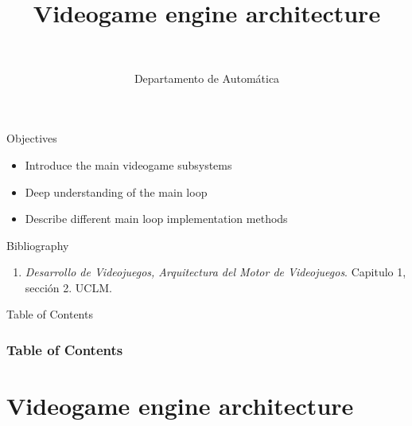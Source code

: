 \documentclass[10pt,compress]{beamer} %
\title[Videogame engine architecture]{Videogame engine architecture}
\author{\asignatura\\\carrera}
\institute{}
\date{Departamento de Automática}
\begin{document}
{\titlepageBlue
    \begin{frame}
        \titlepage
    \end{frame}
}

\begin{frame}[plain]{}
   \begin{block}{Objectives}
   \begin{itemize}
        \item Introduce the main videogame subsystems
        \item Deep understanding of the main loop
        \item Describe different main loop implementation methods
	\end{itemize}
	\end{block}

   \begin{block}{Bibliography}
      \begin{enumerate}
          \item  \textit{Desarrollo de Videojuegos, Arquitectura del Motor de Videojuegos}. Capitulo 1, sección 2. UCLM.
      \end{enumerate} 
   \end{block}
\end{frame}

{
\begin{frame}[shrink]{Table of Contents}
 \frametitle{Table of Contents}
 \tableofcontents
\end{frame}
}

\section{Videogame engine architecture}
\end{document}
